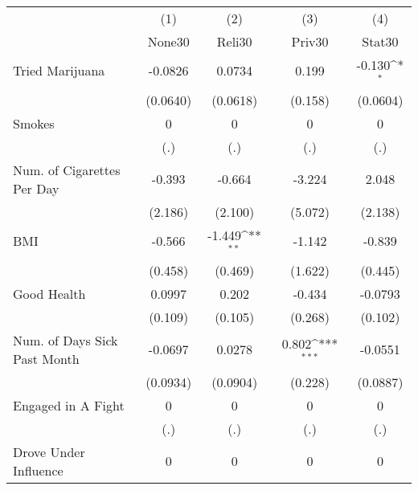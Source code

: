 {
\def\sym#1{\ifmmode^{#1}\else\(^{#1}\)\fi}
\begin{tabular}{l*{4}{c}}
\hline\hline
            &\multicolumn{1}{c}{(1)}&\multicolumn{1}{c}{(2)}&\multicolumn{1}{c}{(3)}&\multicolumn{1}{c}{(4)}\\
            &\multicolumn{1}{c}{None30}&\multicolumn{1}{c}{Reli30}&\multicolumn{1}{c}{Priv30}&\multicolumn{1}{c}{Stat30}\\
\hline
Tried Marijuana&     -0.0826         &      0.0734         &       0.199         &      -0.130\sym{*}  \\
            &    (0.0640)         &    (0.0618)         &     (0.158)         &    (0.0604)         \\
[1em]
Smokes      &           0         &           0         &           0         &           0         \\
            &         (.)         &         (.)         &         (.)         &         (.)         \\
[1em]
Num. of Cigarettes Per Day&      -0.393         &      -0.664         &      -3.224         &       2.048         \\
            &     (2.186)         &     (2.100)         &     (5.072)         &     (2.138)         \\
[1em]
BMI         &      -0.566         &      -1.449\sym{**} &      -1.142         &      -0.839         \\
            &     (0.458)         &     (0.469)         &     (1.622)         &     (0.445)         \\
[1em]
Good Health &      0.0997         &       0.202         &      -0.434         &     -0.0793         \\
            &     (0.109)         &     (0.105)         &     (0.268)         &     (0.102)         \\
[1em]
Num. of Days Sick Past Month&     -0.0697         &      0.0278         &       0.802\sym{***}&     -0.0551         \\
            &    (0.0934)         &    (0.0904)         &     (0.228)         &    (0.0887)         \\
[1em]
Engaged in A Fight&           0         &           0         &           0         &           0         \\
            &         (.)         &         (.)         &         (.)         &         (.)         \\
[1em]
Drove Under Influence&           0         &           0         &           0         &           0         \\

\end{tabular}}
